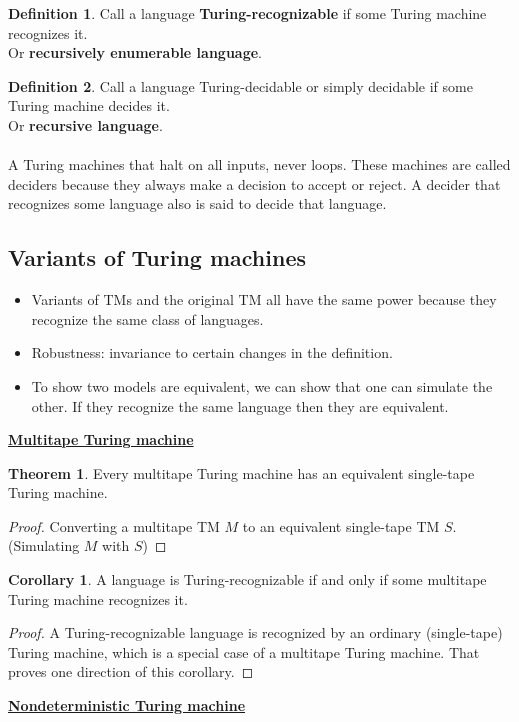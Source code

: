 \documentclass[11pt]{article}
\theoremstyle{definition}
\newtheorem{defn}{Definition}[section]
\newtheorem{thm}{Theorem}[section]
\newtheorem{cor}{Corollary}[thm]
\begin{document}
\begin{defn}
Call a language \textbf{Turing-recognizable} if some Turing machine recognizes it.\\
Or \textbf{recursively enumerable language}.
\end{defn}
\begin{defn}
Call a language Turing-decidable or simply decidable if some Turing machine decides it.\\
Or \textbf{recursive language}.\\\\
A Turing machines that halt on all inputs, never loops. These machines are called deciders because they always make a decision to accept or reject. A decider that recognizes some language also is said to decide that language.
\end{defn}
\subsection{Variants of Turing machines}
\begin{itemize}[leftmargin=*]
    \item Variants of TMs and the original TM all have the same power because they recognize the same class of languages.
    \item Robustness: invariance to certain changes in the definition.
    \item To show two models are equivalent, we can show that one can simulate the other. If they recognize the same language then they are equivalent.
\end{itemize}
\textbf{\underline{Multitape Turing machine}}
\begin{thm}
    Every multitape Turing machine has an equivalent single-tape Turing machine.
\end{thm}
\begin{proof}
    Converting a multitape TM $M$ to an equivalent single-tape TM $S$. (Simulating $M$ with $S$)
\end{proof}
\begin{cor}
    A language is Turing-recognizable if and only if some multitape Turing machine recognizes it.
\end{cor}
\begin{proof}
    A Turing-recognizable language is recognized by an ordinary (single-tape) Turing machine, which is a special case of a multitape Turing machine. That proves one direction of this corollary.
\end{proof}
\textbf{\underline{Nondeterministic Turing machine}}
\end{document}

